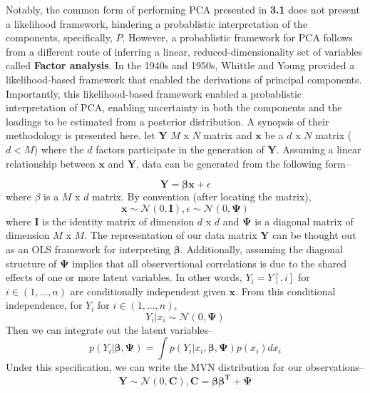 \documentclass[english, 11pt]{article}\usepackage[]{graphicx}\usepackage[]{color}
\begin{document}
Notably, the common form of performing PCA presented in \textbf{3.1} does not present a likelihood framework, hindering a probablistic interpretation of the components, specifically, $P$. However, a probablistic framework for PCA follows from a different route of inferring a linear, reduced-dimensionality set of variables called \textbf{Factor analysis}. \newline \newline In the 1940s and 1950s, Whittle \cite{whittle1952principal} and Young \cite{young1941maximum} provided a likelihood-based framework that enabled the derivations of principal components. Importantly, this likelihood-based framework enabled a probablistic interpretation of PCA, enabling uncertainty in both the components and the loadings to be estimated from a posterior distribution. A synopsis of their methodology is presented here.
\newline \newline
let $\mathbf{Y}$ $M$ x $N$ matrix and $\mathbf{x}$ be a $d$ x $N$ matrix ($d < M$) where the $d$ factors participate in the generation of $\mathbf{Y}$. Assuming a linear relationship between $\mathbf{x}$ and $\mathbf{Y}$, data can be generated from the following form--

$$ \mathbf{Y = \beta x} + \epsilon$$
where $\beta$ is a $M$ x $d$ matrix. 
\newline \newline
By convention (after locating the matrix), $$\mathbf{x} \sim \mathcal{N} (0, \mathbf{I}), \epsilon \sim \mathcal{N} (0, \mathbf{\Psi})$$
where $\mathbf{I}$ is the identity matrix of dimension $d$ x $d$ and $\mathbf{\Psi}$ is a diagonal matrix of dimension $M$ x $M$. The representation of our data matrix $\mathbf{Y}$ can be thought out as an OLS framework for interpreting $\mathbf{\beta}$. Additionally, assuming the diagonal structure of $\mathbf{\Psi}$ implies that all observertional correlations is due to the shared effects of one or more latent variables. In other words, $Y_i = Y[,i]$ for $i \in (1, ..., n)$ are conditionally independent given $\mathbf{x}$. 
\newline \newline
From this conditional independence, for $Y_i$ for $i \in (1, ..., n)$, $$Y_i |x_i \sim  \mathcal{N} (0, \mathbf{\Psi})$$
Then we can integrate out the latent variables--
$$p( Y_i |\mathbf{\beta}, \mathbf{\Psi})= \int p( Y_i | x_i , \mathbf{\beta, \Psi}) p(x_i) dx_i  $$
Under this specification, we can write the MVN distribution for our observations-- $$\mathbf{Y} \sim  \mathcal{N} (0, \mathbf{C}), \mathbf{C} = \mathbf{\beta \beta^T }+ \mathbf{\Psi}  $$
\end{document}
